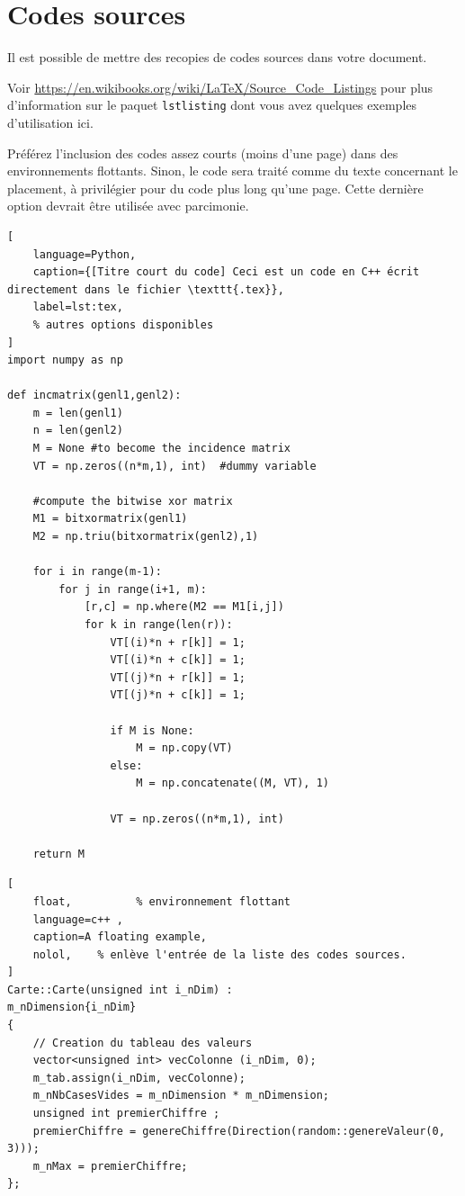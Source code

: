 \clearpage

\section{Codes sources}


Il est possible de mettre des recopies de codes sources dans votre document. 

Voir \url{https://en.wikibooks.org/wiki/LaTeX/Source_Code_Listings} pour plus d'information sur le paquet \texttt{lstlisting} dont vous avez quelques exemples d'utilisation ici.

Préférez l'inclusion des codes assez courts (moins d'une page) dans des environnements flottants. Sinon, le code sera traité comme du texte concernant le placement, à privilégier pour du code plus long qu'une page. Cette dernière option devrait être utilisée avec parcimonie.

\begin{lstlisting}[
	language=Python, 
	caption={[Titre court du code] Ceci est un code en C++ écrit directement dans le fichier \texttt{.tex}},
	label=lst:tex,
	% autres options disponibles
]
import numpy as np

def incmatrix(genl1,genl2):
	m = len(genl1)
	n = len(genl2)
	M = None #to become the incidence matrix
	VT = np.zeros((n*m,1), int)  #dummy variable
	
	#compute the bitwise xor matrix
	M1 = bitxormatrix(genl1)
	M2 = np.triu(bitxormatrix(genl2),1) 
	
	for i in range(m-1):
		for j in range(i+1, m):
			[r,c] = np.where(M2 == M1[i,j])
			for k in range(len(r)):
				VT[(i)*n + r[k]] = 1;
				VT[(i)*n + c[k]] = 1;
				VT[(j)*n + r[k]] = 1;
				VT[(j)*n + c[k]] = 1;
	
				if M is None:
					M = np.copy(VT)
				else:
					M = np.concatenate((M, VT), 1)
				
				VT = np.zeros((n*m,1), int)
	
	return M
\end{lstlisting}

\begin{lstlisting}[
	float, 			% environnement flottant
	language=c++ ,
	caption=A floating example, 
	nolol,    % enlève l'entrée de la liste des codes sources.
]
Carte::Carte(unsigned int i_nDim) :
m_nDimension{i_nDim}
{
	// Creation du tableau des valeurs
	vector<unsigned int> vecColonne (i_nDim, 0);
	m_tab.assign(i_nDim, vecColonne);
	m_nNbCasesVides = m_nDimension * m_nDimension;
	unsigned int premierChiffre ;
	premierChiffre = genereChiffre(Direction(random::genereValeur(0, 3)));
	m_nMax = premierChiffre;
};
\end{lstlisting}

